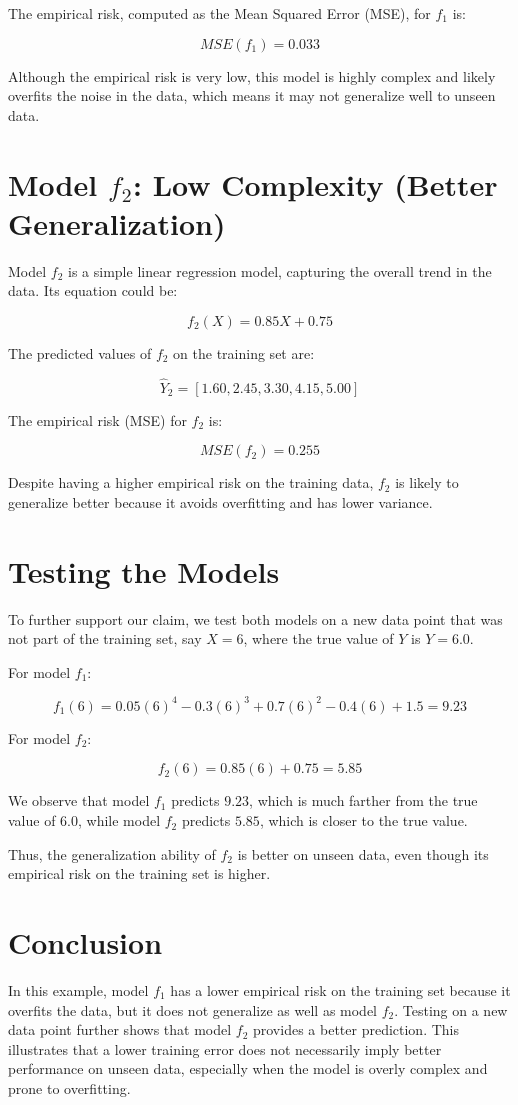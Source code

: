 \documentclass{article}
\begin{document}
The empirical risk, computed as the Mean Squared Error (MSE), for \( f_1 \) is:

\[
MSE(f_1) = 0.033
\]

Although the empirical risk is very low, this model is highly complex and likely overfits the noise in the data, which means it may not generalize well to unseen data.

\section*{Model \( f_2 \): Low Complexity (Better Generalization)}

Model \( f_2 \) is a simple linear regression model, capturing the overall trend in the data. Its equation could be:

\[
f_2(X) = 0.85X + 0.75
\]

The predicted values of \( f_2 \) on the training set are:

\[
\hat{Y}_2 = [1.60, 2.45, 3.30, 4.15, 5.00]
\]

The empirical risk (MSE) for \( f_2 \) is:

\[
MSE(f_2) = 0.255
\]

Despite having a higher empirical risk on the training data, \( f_2 \) is likely to generalize better because it avoids overfitting and has lower variance.

\section*{Testing the Models}

To further support our claim, we test both models on a new data point that was not part of the training set, say \( X = 6 \), where the true value of \( Y \) is \( Y = 6.0 \).

For model \( f_1 \):

\[
f_1(6) = 0.05(6)^4 - 0.3(6)^3 + 0.7(6)^2 - 0.4(6) + 1.5 = 9.23
\]

For model \( f_2 \):

\[
f_2(6) = 0.85(6) + 0.75 = 5.85
\]

We observe that model \( f_1 \) predicts \( 9.23 \), which is much farther from the true value of \( 6.0 \), while model \( f_2 \) predicts \( 5.85 \), which is closer to the true value. 

Thus, the generalization ability of \( f_2 \) is better on unseen data, even though its empirical risk on the training set is higher.

\section*{Conclusion}

In this example, model \( f_1 \) has a lower empirical risk on the training set because it overfits the data, but it does not generalize as well as model \( f_2 \). Testing on a new data point further shows that model \( f_2 \) provides a better prediction. This illustrates that a lower training error does not necessarily imply better performance on unseen data, especially when the model is overly complex and prone to overfitting.
\end{document}
